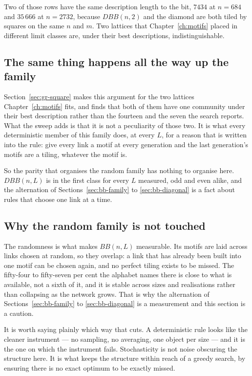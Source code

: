 Two of those rows have the same description length to the bit, $7434$ at $n=684$
and $35\,666$ at $n=2732$, because $DBB(n,2)$ and the diamond are both tiled by
squares on the same $n$ and $m$. Two lattices that Chapter~\ref{ch:motifs} placed
in different limit classes are, under their best descriptions, indistinguishable.

\subsection*{The same thing happens all the way up the family}

Section~\ref{sec:gr-square} makes this argument for the two lattices
Chapter~\ref{ch:motifs} fits, and finds that both of them have one community
under their best description rather than the fourteen and the seven the search
reports. What the sweep adds is that it is not a peculiarity of those two. It is
what every deterministic member of this family does, at every $L$, for a reason
that is written into the rule: give every link a motif at every generation and
the last generation's motifs are a tiling, whatever the motif is.

So the parity that organises the random family has nothing to organise here.
$DBB(n,L)$ is in the first class for every $L$ measured, odd and even alike, and
the alternation of Sections~\ref{sec:bb-family} to \ref{sec:bb-diagonal} is a
fact about rules that choose one link at a time.

\subsection*{Why the random family is not touched}

The randomness is what makes $BB(n,L)$ measurable. Its motifs are laid across
links chosen at random, so they overlap: a link that has already been built into
one motif can be chosen again, and no perfect tiling exists to be missed. The
fifty-four to fifty-seven per cent the alphabet names there is close to what is
available, not a sixth of it, and it is stable across sizes and realisations
rather than collapsing as the network grows. That is why the alternation of
Sections~\ref{sec:bb-family} to \ref{sec:bb-diagonal} is a measurement and this
section is a caution.

It is worth saying plainly which way that cuts. A deterministic rule looks like
the cleaner instrument --- no sampling, no averaging, one object per size --- and
it is the one on which the instrument fails. Stochasticity is not noise obscuring
the structure here. It is what keeps the structure within reach of a greedy
search, by ensuring there is no exact optimum to be exactly missed.

